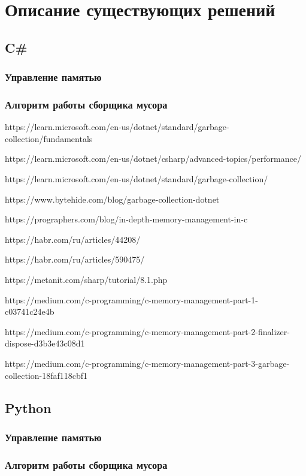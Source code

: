 \chapter{Описание существующих решений}

\section{C\#}
\subsection{Управление памятью}
\subsection{Алгоритм работы сборщика мусора}
https://learn.microsoft.com/en-us/dotnet/standard/garbage-collection/fundamentals

https://learn.microsoft.com/en-us/dotnet/csharp/advanced-topics/performance/

https://learn.microsoft.com/en-us/dotnet/standard/garbage-collection/

https://www.bytehide.com/blog/garbage-collection-dotnet

https://prographers.com/blog/in-depth-memory-management-in-c

https://habr.com/ru/articles/44208/

https://habr.com/ru/articles/590475/

https://metanit.com/sharp/tutorial/8.1.php



https://medium.com/c-programming/c-memory-management-part-1-c03741c24e4b

https://medium.com/c-programming/c-memory-management-part-2-finalizer-dispose-d3b3e43c08d1

https://medium.com/c-programming/c-memory-management-part-3-garbage-collection-18faf118cbf1





\section{Python}
\subsection{Управление памятью}
\subsection{Алгоритм работы сборщика мусора}

